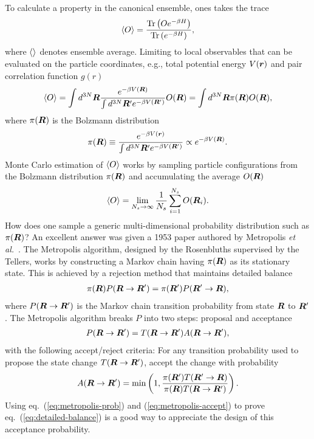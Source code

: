To calculate a property in the canonical ensemble, ones takes the trace
\begin{align}
\braket{O} = \dfrac{\text{Tr}\left(Oe^{-\beta H}\right)}{\text{Tr}\left(e^{-\beta H}\right)},
\end{align}
where $\braket{}$ denotes ensemble average. Limiting to local observables that can be evaluated on the particle coordinates, e.g., total potential energy $V(\boldsymbol{r})$ and pair correlation function $g(r)$
\begin{align} \label{eq:int-obs}
\braket{O} = \int d^{3N}\boldsymbol{R} \dfrac{e^{-\beta V(\boldsymbol{R})}}{\int d^{3N}\boldsymbol{R}' e^{-\beta V(\boldsymbol{R}')}} O(\boldsymbol{R}) = \int d^{3N}\boldsymbol{R} \pi(\boldsymbol{R})O(\boldsymbol{R}),
\end{align}
where $\pi(\boldsymbol{R})$ is the Bolzmann distribution
\begin{align} \label{eq:bolzmann-pi}
\pi(\boldsymbol{R}) \equiv \dfrac{e^{-\beta V(\boldsymbol{r})}}{\int d^{3N}\boldsymbol{R}' e^{-\beta V(\boldsymbol{R}')}} \propto e^{-\beta V(\boldsymbol{R})}.
\end{align}
Monte Carlo estimation of $\braket{O}$ works by sampling particle configurations from the Bolzmann distribution $\pi(\boldsymbol{R})$ and accumulating the average $O(\boldsymbol{R})$
\begin{align}
\braket{O} = \lim\limits_{N_s\rightarrow\infty} \frac{1}{N_s} \sum\limits_{i=1}^{N_s} O(\boldsymbol{R}_i).
\end{align}
How does one sample a generic multi-dimensional probability distribution such as $\pi(\boldsymbol{R})$?
An excellent answer was given a 1953 paper authored by Metropolis \textit{et al.}~\cite{Metropolis1953}. The Metropolis algorithm, designed by the Rosenbluths supervised by the Tellers, works by constructing a Markov chain having $\pi(\boldsymbol{R})$ as its stationary state. This is achieved by a rejection method that maintains detailed balance
\begin{align} \label{eq:detailed-balance}
\pi(\boldsymbol{R})P(\boldsymbol{R}\rightarrow\boldsymbol{R}')=\pi(\boldsymbol{R}')P(\boldsymbol{R}'\rightarrow\boldsymbol{R}),
\end{align}
where $P(\boldsymbol{R}\rightarrow\boldsymbol{R}')$ is the Markov chain transition probability from state $\boldsymbol{R}$ to $\boldsymbol{R}'$. The Metropolis algorithm breaks $P$ into two steps: proposal and acceptance
\begin{align} \label{eq:metropolis-prob}
P(\boldsymbol{R}\rightarrow\boldsymbol{R}') = T(\boldsymbol{R}\rightarrow\boldsymbol{R}')A(\boldsymbol{R}\rightarrow\boldsymbol{R}'),
\end{align}
with the following accept/reject criteria: For any transition probability used to propose the state change $T(\boldsymbol{R}\rightarrow\boldsymbol{R}')$, accept the change with probability
\begin{align} \label{eq:metropolis-accept}
A(\boldsymbol{R}\rightarrow\boldsymbol{R}') = \min\left(1, \dfrac{\pi(\boldsymbol{R}')T(\boldsymbol{R}'\rightarrow\boldsymbol{R})}{\pi(\boldsymbol{R})T(\boldsymbol{R}\rightarrow\boldsymbol{R}')}\right).
\end{align}
Using eq.~(\ref{eq:metropolis-prob}) and (\ref{eq:metropolis-accept}) to prove eq.~(\ref{eq:detailed-balance}) is a good way to appreciate the design of this acceptance probability.

